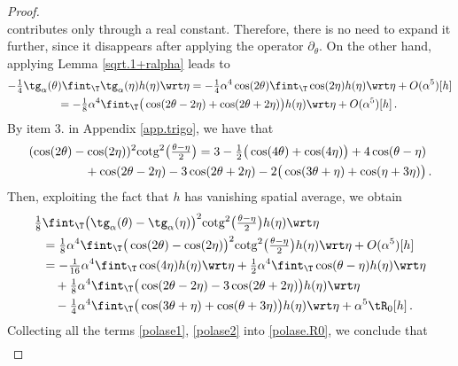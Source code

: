 \documentclass[a4paper,reqno,10pt]{article}
\begin{document}
\begin{proof}
\[\]
contributes only through a real constant. Therefore, there is no need to expand it further, since it disappears after applying the operator \(\partial_\theta\).
    On the other hand, applying  Lemma \ref{sqrt.1+ralpha} leads to
	\begin{align}
			- \tfrac{1}{4} \tg_{\alpha}(\theta&)\fint_{\T} \tg_{\alpha}(\eta)h(\eta) \wrt\eta  = -\tfrac{1}{4}\alpha^4 \cos(2\theta) \fint_{\T} \cos(2\eta) h(\eta) \wrt\eta + O(\alpha^5)[h] \\
			&=-\tfrac{1}{8} \alpha^4\fint_{\T}\big( \cos(2\theta-2\eta) + \cos(2\theta+2\eta) \big)h(\eta) \wrt\eta + O(\alpha^5)[h]  \,.\label{polase1}
	\end{align}
	By item $3.$ in Appendix \ref{app.trigo}, we have that
	\begin{equation}
		\begin{aligned}
			(	\cos(2\theta)&-\cos(2\eta))^2  {\rm cotg}^2\big(\tfrac{\theta-\eta}{2}\big)  
			 = 3 - \tfrac12\big( \cos(4\theta)+\cos(4\eta)\big) + 4 \cos(\theta-\eta)  \\
			&\quad + \cos(2\theta-2\eta) -3\cos(2\theta+2\eta) -2\big( \cos(3\theta+\eta)+\cos(\eta+3\eta) \big)\,.
		\end{aligned}
	\end{equation}
Then, exploiting the fact that \(h\) has vanishing spatial average, we obtain
	\begin{align}
		\tfrac{1}{8} & \fint_{\T} \big( \tg_{\alpha}(\theta)- \tg_{\alpha}(\eta) \big)^2 {\rm cotg}^2\big(\tfrac{\theta-\eta}{2}\big) h(\eta) \wrt\eta \\
		&= \tfrac{1}{8}\alpha^4 \fint_{\T} \big( \cos(2\theta)- \cos(2\eta) \big)^2 {\rm cotg}^2\big(\tfrac{\theta-\eta}{2}\big) h(\eta) \wrt\eta + O(\alpha^5)[h] \\
		& =-\tfrac{1}{16}\alpha^4 \fint_{\T} \cos(4\eta) h(\eta) \wrt\eta 
		+\tfrac{1}{2}\alpha^4\fint_{\T}\cos(\theta-\eta)h(\eta) \wrt\eta \\
		& \quad +\tfrac{1}{8}\alpha^4\fint_{\T}\big( \cos(2\theta-2\eta) -3\cos(2\theta+2\eta) \big)h(\eta) \wrt\eta \\
		& \quad -\tfrac{1}{4}\alpha^4 \fint_{\T} \big( \cos(3\theta+\eta) +\cos(\theta+3\eta) \big)h(\eta) \wrt\eta + \alpha^5 \tR_{0}[h]\,.\label{polase2}
	\end{align}
Collecting all the terms \eqref{polase1}, \eqref{polase2} into \eqref{polase.R0}, 
we conclude that
	\begin{align}\label{Expand-R-0}

\end{align}
\end{proof}
\end{document}
